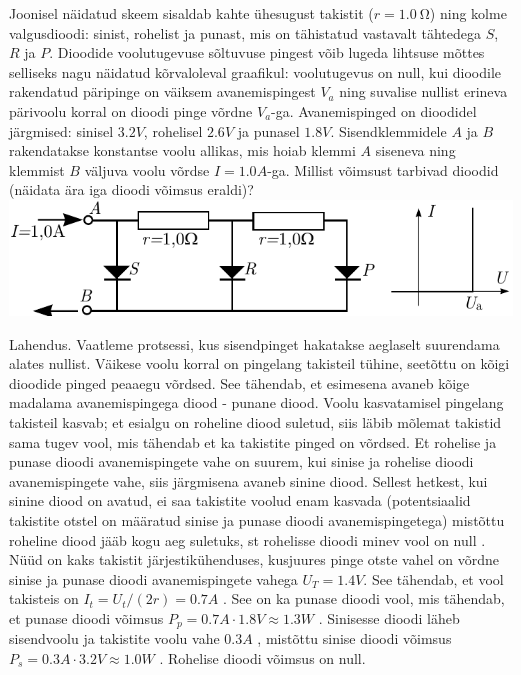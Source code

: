\setAuthor{}

Joonisel näidatud skeem sisaldab kahte ühesugust takistit ($r=\SI {1.0}\ohm$) ning kolme valgusdioodi: sinist, rohelist ja punast, mis on tähistatud vastavalt tähtedega $S$, $R$ ja $P$. Dioodide voolutugevuse sõltuvuse pingest võib lugeda lihtsuse mõttes selliseks nagu näidatud kõrvaloleval graafikul: voolutugevus on null, kui dioodile rakendatud päripinge on väiksem avanemispingest $V_a$ ning suvalise nullist erineva pärivoolu korral on dioodi pinge võrdne $V_a$-ga. Avanemispinged on dioodidel järgmised: sinisel $\SI{3.2}V$, rohelisel  $\SI{2.6}V$ ja punasel  $\SI{1.8}V$. Sisendklemmidele $A$ ja $B$ rakendatakse konstantse voolu allikas, mis hoiab klemmi $A$ siseneva ning klemmist $B$ väljuva voolu võrdse $I=\SI{1.0}A$-ga. Millist võimsust tarbivad dioodid (näidata ära iga dioodi võimsus eraldi)? 
\includegraphics[scale=0.8]{2019-v2g-10-yl.pdf}

\hint

\solu
Lahendus. Vaatleme protsessi, kus sisendpinget hakatakse aeglaselt suurendama alates nullist. Väikese voolu korral on pingelang takisteil tühine, seetõttu on kõigi dioodide pinged peaaegu võrdsed. See tähendab, et esimesena avaneb kõige madalama avanemispingega diood - punane diood. Voolu kasvatamisel pingelang takisteil kasvab; et esialgu on roheline diood suletud, siis läbib mõlemat takistid sama tugev vool, mis tähendab et ka takistite pinged on võrdsed. Et rohelise ja punase dioodi avanemispingete vahe on suurem, kui sinise ja rohelise dioodi avanemispingete vahe, siis järgmisena avaneb sinine diood. Sellest hetkest, kui sinine diood on avatud, ei saa takistite voolud enam kasvada (potentsiaalid takistite otstel on määratud sinise ja punase dioodi avanemispingetega) mistõttu roheline diood jääb kogu aeg suletuks, st rohelisse dioodi minev vool on null . Nüüd on kaks takistit järjestikühenduses, kusjuures pinge otste vahel on võrdne sinise ja punase dioodi avanemispingete vahega $U_T=\SI{1.4}V$.  See tähendab, et vool takisteis on $I_t=U_t/(2r)=\SI{0.7}A$ . See on ka punase dioodi vool, mis tähendab, et punase dioodi võimsus $P_p=\SI{0.7}A\cdot \SI{1.8}V\approx {1.3}W$ . Sinisesse dioodi läheb sisendvoolu ja takistite voolu vahe $\SI{0.3}A$ , mistõttu sinise dioodi võimsus $P_s=\SI{0.3}A\cdot \SI{3.2}V\approx {1.0}W$ . Rohelise dioodi võimsus on null. 
\probend